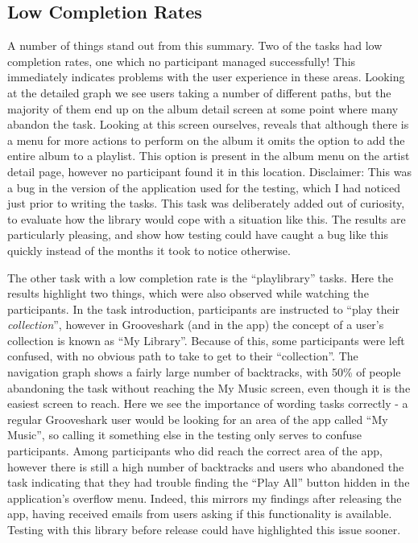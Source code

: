 \subsection{Low Completion Rates}

A number of things stand out from this summary. Two of the tasks had low completion
rates, one which no participant managed successfully! This immediately indicates problems with
the user experience in these areas. Looking at the detailed graph we see users taking a
number of different paths, but the majority of them end up on the album detail screen at some
point where many abandon the task. Looking at this screen ourselves, reveals that although
there is a menu for more actions to perform on the album it omits the option to add
the entire album to a playlist. This option is present in the album menu on the artist
detail page, however no participant found it in this location. Disclaimer: This was
a bug in the version of the application used for the testing, which I had noticed just
prior to writing the tasks. This task was deliberately added out of curiosity, to evaluate
how the library would cope with a situation like this. The results are particularly pleasing,
and show how testing could have caught a bug like this quickly instead of the months it took
to notice otherwise.

The other task with a low completion rate is the ``playlibrary'' tasks. Here the results
highlight two things, which were also observed while watching the participants.
In the task introduction, participants are instructed to ``play their \emph{collection}'',
however in Grooveshark (and in the app) the concept of a user's collection is known as 
``My Library''. Because of this, some participants were left confused, with no obvious path
to take to get to their ``collection''. The navigation graph shows a fairly large number of
backtracks, with 50\% 
of people abandoning the task without reaching the My Music screen,
even though it is the easiest screen to reach. Here we see the importance of wording 
tasks correctly - a regular
Grooveshark user would be looking for an area of the app called ``My Music'', so
calling it something else in the testing only serves to confuse participants.
Among participants who did reach the correct area of the app, however there is still
a high number of backtracks and users who abandoned the task indicating that they had trouble
finding the ``Play All'' button hidden in the application's overflow menu. Indeed, this mirrors
my findings after releasing the app, having received emails from users asking if this functionality
is available. Testing with this library before release could have highlighted this issue sooner.

